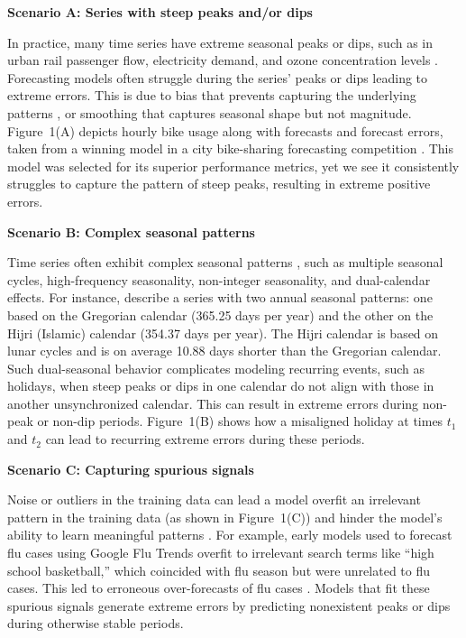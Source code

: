 \documentclass[]{interact}
\theoremstyle{definition}
\newenvironment{scenario}[1]{%
  \par\vspace{1ex}\noindent\textbf{#1}\par\vspace{0.5ex}}{\par}
\begin{document}
\begin{scenario}{Scenario A: Series with steep peaks and/or dips}
In practice, many time series have extreme seasonal peaks or dips, such as in urban rail passenger flow, electricity demand, and ozone concentration levels  \citep{li2024, amaraouali2023, marvin2022}. Forecasting models often struggle during the series' peaks or dips leading to extreme errors. This is due to bias that prevents capturing the underlying patterns \citep{lin2023}, or smoothing that captures seasonal shape but not magnitude. Figure~1(A) depicts hourly bike usage along with forecasts and forecast errors, taken from a winning model in a city bike-sharing forecasting competition \citep{mohit2020}. This model was selected for its superior performance metrics, yet we see it consistently struggles to capture the pattern of steep peaks, resulting in extreme positive errors.
\end{scenario}

\begin{scenario}{Scenario B: Complex seasonal patterns}

Time series often exhibit complex seasonal patterns \citep{zhao2024}, such as multiple seasonal cycles, high-frequency seasonality, non-integer seasonality, and dual-calendar effects. For instance, \cite{delivera2011} describe a series with two annual seasonal patterns: one based on the Gregorian calendar (365.25 days per year) and the other on the Hijri (Islamic) calendar (354.37 days per year). The Hijri calendar is based on lunar cycles and is on average 10.88 days shorter than the Gregorian calendar. Such dual-seasonal behavior complicates modeling recurring events, such as holidays, when steep peaks or dips in one calendar do not align with those in another unsynchronized calendar. This can %
result in extreme errors during non-peak or non-dip periods. %
Figure~1(B) shows %
how a misaligned holiday at times $t_1$ and $t_2$ can lead to recurring extreme errors during these periods.
\end{scenario}

\begin{scenario}{Scenario C: Capturing spurious signals}

Noise or outliers in the training data can lead a model overfit an irrelevant pattern in the training data (as shown in Figure~1(C)) and hinder the model's ability to learn meaningful patterns \citep{cakmak2024}. For example, early models used to forecast flu cases using Google Flu Trends overfit to irrelevant search terms like ``high school basketball,'' which coincided with flu season but were unrelated to flu cases. This led to erroneous over-forecasts of flu cases \citep{lazer2014}. Models that fit these spurious signals generate extreme errors by predicting nonexistent peaks or dips during otherwise stable periods.
\end{scenario}
\end{document}
